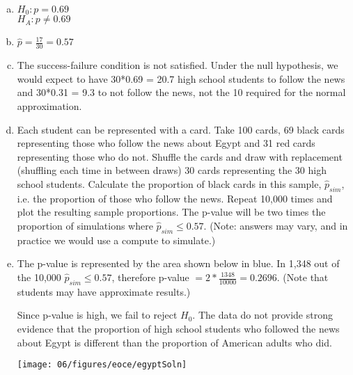 {
\begin{enumerate}[(a)]
\setlength{\itemsep}{0mm}
\item $H_0: p = 0.69$ \\
$H_A: p \ne 0.69$
\item $\hat{p} = \frac{17}{30} = 0.57$
\item The success-failure condition is not satisfied. Under the null hypothesis, we would expect to have 30*0.69 = 20.7 high school students to follow the news and 30*0.31 = 9.3 to not follow the news, not the 10 required for the normal approximation.
\item Each student can be represented with a card. Take 100 cards, 69 black cards representing those who follow the news about Egypt and 31 red cards representing those who do not. Shuffle the cards and draw with replacement (shuffling each time in between draws) 30 cards representing the 30 high school students. Calculate the proportion of black cards in this sample, $\hat{p}_{sim}$, i.e. the proportion of those who follow the news. Repeat 10,000 times and plot the resulting sample proportions. The p-value will be two times the proportion of simulations where $\hat{p}_{sim} \le 0.57$. (Note: answers may vary, and in practice we would use a compute to simulate.)
\item The p-value is represented by the area shown below in blue. In 1,348 out of the 10,000 $\hat{p}_{sim} \le 0.57$, therefore p-value $= 2 * \frac{1348}{10000} = 0.2696$. (Note that students may have approximate results.) 
\noindent \begin{minipage}[c]{0.5\textwidth}
Since p-value is high, we fail to reject $H_0$. The data do not provide strong evidence that the proportion of high school students who followed the news about Egypt is different than the proportion of American adults who did. 
\end{minipage}
\begin{minipage}[c]{0.5\textwidth}
\begin{center}
\texttt{[image: 06/figures/eoce/egyptSoln]}
\end{center}
\end{minipage}
\end{enumerate}
}

\pagebreak

